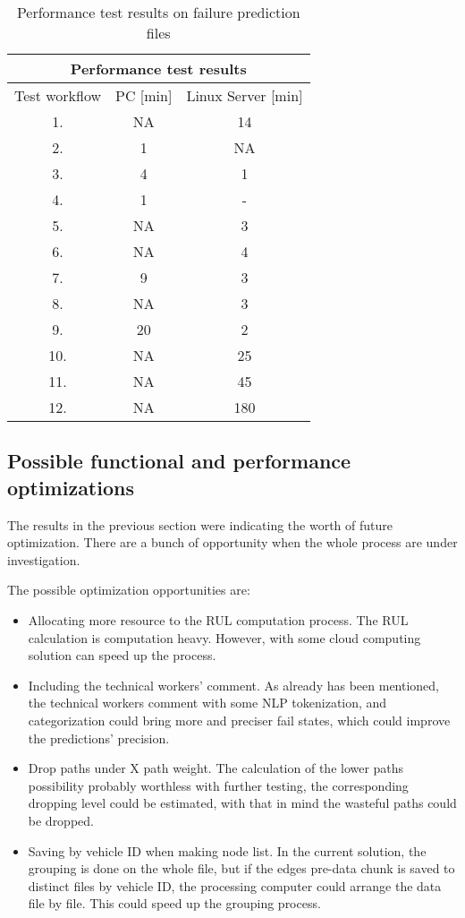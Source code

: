 \begin{table}[H]
\centering
\begin{tabular}{ |c|c|c|  }
\hline
\multicolumn{3}{|c|}{Performance test results} \\
\hline
Test workflow& PC [min] & Linux Server [min]\\
\hline
1.& NA & 14 \\
2.& 1 & NA \\
3.& 4 & 1 \\
4.& 1 & - \\
5.& NA & 3 \\
6.& NA & 4 \\
7.& 9 & 3 \\
8.& NA & 3 \\
9.& 20 & 2 \\
10.& NA & 25 \\
11.& NA & 45 \\
12.& NA & 180 \\
\hline
\end{tabular}
\caption{Performance test results on failure prediction files}
\label{table:3}
\end{table}
\subsection{Possible functional and performance optimizations}
The results in the previous section were indicating the worth of future optimization. There are a bunch of opportunity when the whole process are under investigation.

The possible optimization opportunities are:
\begin{itemize}
	\item{Allocating more resource to the RUL computation process.} The RUL calculation is computation heavy. However, with some cloud computing solution can speed up the process.
	\item{Including the technical workers' comment.} As already has been mentioned, the technical workers comment with some NLP tokenization, and categorization could bring more and preciser fail states, which could improve the predictions' precision.
	\item{Drop paths under X path weight.} The calculation of the lower paths possibility probably worthless with further testing, the corresponding dropping level could be estimated, with that in mind the wasteful paths could be dropped.
	\item{Saving by vehicle ID when making node list.} In the current solution, the grouping is done on the whole file, but if the edges pre-data chunk is saved to distinct files by vehicle ID, the processing computer could arrange the data file by file. This could speed up the grouping process.
\end{itemize} 
